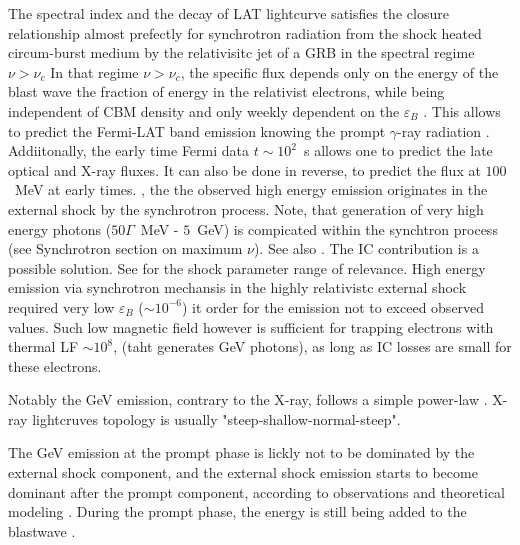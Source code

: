The spectral index and the decay of LAT lightcurve satisfies the closure relationship almost prefectly for synchrotron radiation from the shock heated circum-burst medium by the relativisitc jet of a GRB in the spectral regime  $\nu > \nu_c$ 
In that regime $\nu > \nu_c$, the specific flux depends only on the energy of the blast wave the fraction of energy in the relativist electrons, while being independent of CBM density and only weekly dependent on the $\varepsilon_B$ \cite{Kumar (2000)}. 
This allows to predict the Fermi-LAT band emission knowing the prompt $\gamma$-ray radiation \cite{Kumar and Barniol Duran, 2010}. 
Addiitonally, the early time Fermi data $t\sim10^2$~s allows one to predict the late optical and X-ray fluxes. It can also be done in reverse, to predict the flux at $100$~MeV at early times.
, the the observed high energy emission originates in the external shock by the synchrotron process.
Note, that generation of very high energy photons ($50\Gamma$~MeV - $5$~GeV) is compicated within the synchtron process (see Synchrotron section on maximum $\nu$). See also \cite{Kumar et al. (2012)}. 
The IC contribution is a possible solution. See \cite{Zhang and Meszaros (2001b)} for the shock parameter range of relevance. 
High energy emission via synchrotron mechansis in the highly relativistc external shock required very low $\varepsilon_B$ ($\sim 10^{-6}$) it order for the emission not to exceed observed values. Such low magnetic field however is sufficient for trapping electrons with thermal LF $\sim10^8$, (taht generates GeV photons), as long as IC losses are small for these electrons.

Notably the GeV emission, contrary to the X-ray, follows a simple power-law \cite{Liang et al., 2009; Evans et al., 2009}.
X-ray lightcruves topology is usually "steep-shallow-normal-steep". 

The GeV emission at the prompt phase is  lickly not to be dominated by the external shock component, and the external shock emission starts to become dominant after the prompt component, according to observations \cite{Zhang et al., 2011} and theoretical modeling \cite{Gao et al., 2009; Maxham et al., 2011; He et al., 2011; Liu and Wang, 2011}. 
During the prompt phase, the energy is still being added to the blastwave \cite{Maxham et al., 2011}.

